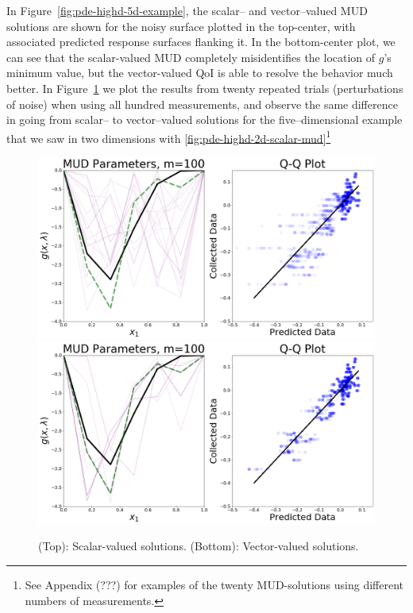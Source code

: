 In Figure~\ref{fig:pde-highd-5d-example}, the scalar-- and vector--valued MUD solutions are shown for the noisy surface plotted in the top-center, with associated predicted response surfaces flanking it.
In the bottom-center plot, we can see that the scalar-valued MUD completely misidentifies the location of $g$'s minimum value, but the vector-valued QoI is able to resolve the behavior much better.
In Figure~\ref{fig:pde-highd-5d-mud} we plot the results from twenty repeated trials (perturbations of noise) when using all hundred measurements, and observe the same difference in going from scalar-- to vector--valued solutions for the five--dimensional example that we saw in two dimensions with \ref{fig:pde-highd-2d-scalar-mud}\footnote{See Appendix (???) for examples of the twenty MUD-solutions using different numbers of measurements.}

\begin{figure}[htbp]
\centering
  \includegraphics[width=0.95\linewidth]{figures/pde-highd/pde-highd_pair_D5-1_m100}
  \includegraphics[width=0.95\linewidth]{figures/pde-highd/pde-highd_pair_D5-5_m100}
\caption{
(Top): Scalar-valued solutions.
(Bottom): Vector-valued solutions.
}
\label{fig:pde-highd-5d-mud}
\end{figure}

